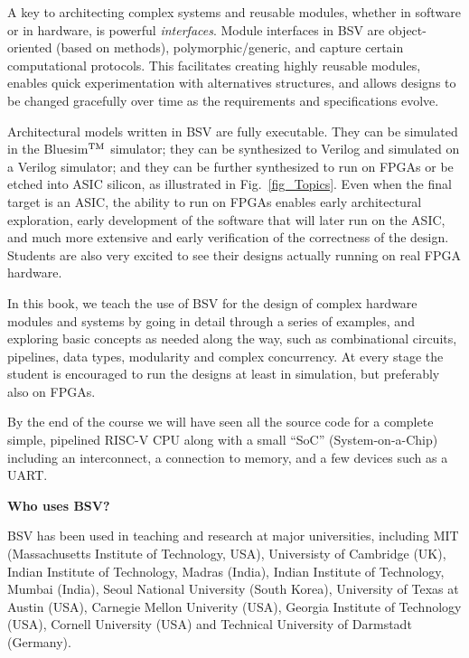 A key to architecting complex systems and reusable modules, whether in
software or in hardware, is powerful \emph{interfaces}.  Module
interfaces in BSV are object-oriented (based on methods),
polymorphic/generic, and capture certain computational protocols.
This facilitates creating highly reusable modules, enables quick
experimentation with alternatives structures, and allows designs to be
changed gracefully over time as the requirements and specifications
evolve.

Architectural models written in BSV are fully executable.  They can be
simulated in the Bluesim$^{\rm TM}$ simulator; they can be synthesized
to Verilog and simulated on a Verilog simulator; and they can be
further synthesized to run on FPGAs or be etched into ASIC silicon, as
illustrated in Fig.~\ref{fig_Topics}.  Even when the final target
is an ASIC, the ability to run on FPGAs enables early architectural
exploration, early development of the software that will later run on
the ASIC, and much more extensive and early verification of the
correctness of the design.  Students are also very excited to see
their designs actually running on real FPGA hardware.

In this book, we teach the use of BSV for the design of complex
hardware modules and systems by going in detail through a series of
examples, and exploring basic concepts as needed along the way, such
as combinational circuits, pipelines, data types, modularity and
complex concurrency.  At every stage the student is encouraged to run
the designs at least in simulation, but preferably also on FPGAs.

By the end of the course we will have seen all the source code for a
complete simple, pipelined RISC-V CPU along with a small ``SoC''
(System-on-a-Chip) including an interconnect, a connection to memory,
and a few devices such as a UART.

\hspace{1cm}

{\large\bf Who uses BSV?}

BSV has been used in teaching and research at major universities,
including MIT (Massachusetts Institute of Technology, USA),
Universisty of Cambridge (UK), Indian Institute of Technology, Madras
(India), Indian Institute of Technology, Mumbai (India), Seoul
National University (South Korea), University of Texas at Austin
(USA), Carnegie Mellon Univerity (USA), Georgia Institute of
Technology (USA), Cornell University (USA) and Technical University of
Darmstadt (Germany).

